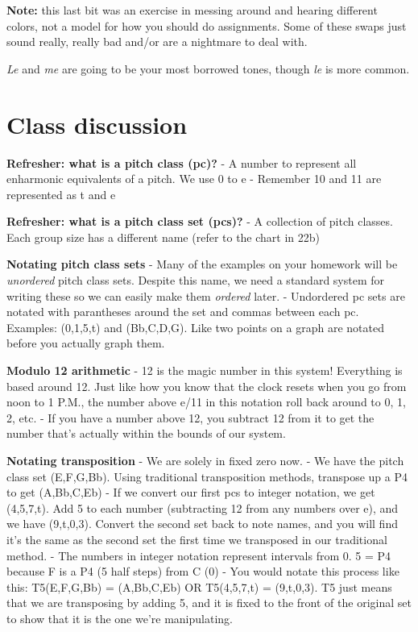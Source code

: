 \documentclass{book}
\begin{document}
\textbf{Note:} this last bit was an exercise in messing around and hearing
different colors, not a model for how you should do assignments. Some of these
swaps just sound really, really bad and/or are a nightmare to deal with.

\emph{Le} and \emph{me} are going to be your most borrowed tones, though
\emph{le} is more common.

\hypertarget{class-discussion-19}{%
\chapter{Class discussion}\label{class-discussion-19}}

\textbf{Refresher: what is a pitch class (pc)?} - A number to represent all
enharmonic equivalents of a pitch. We use 0 to e - Remember 10 and 11 are
represented as t and e

\textbf{Refresher: what is a pitch class set (pcs)?} - A collection of pitch
classes. Each group size has a different name (refer to the chart in 22b)

\textbf{Notating pitch class sets} - Many of the examples on your homework
will be \emph{unordered} pitch class sets. Despite this name, we need a
standard system for writing these so we can easily make them \emph{ordered}
later. - Undordered pc sets are notated with parantheses around the set and
commas between each pc. Examples: (0,1,5,t) and (Bb,C,D,G). Like two points on
a graph are notated before you actually graph them.

\textbf{Modulo 12 arithmetic} - 12 is the magic number in this system!
Everything is based around 12. Just like how you know that the clock resets
when you go from noon to 1 P.M., the number above e/11 in this notation roll
back around to 0, 1, 2, etc. - If you have a number above 12, you subtract 12
from it to get the number that's actually within the bounds of our system.

\textbf{Notating transposition} - We are solely in fixed zero now. - We have
the pitch class set (E,F,G,Bb). Using traditional transposition methods,
transpose up a P4 to get (A,Bb,C,Eb) - If we convert our first pcs to integer
notation, we get (4,5,7,t). Add 5 to each number (subtracting 12 from any
numbers over e), and we have (9,t,0,3). Convert the second set back to note
names, and you will find it's the same as the second set the first time we
transposed in our traditional method. - The numbers in integer notation
represent intervals from 0. 5 = P4 because F is a P4 (5 half steps) from C (0)
- You would notate this process like this: T5(E,F,G,Bb) = (A,Bb,C,Eb) OR
T5(4,5,7,t) = (9,t,0,3). T5 just means that we are transposing by adding 5,
and it is fixed to the front of the original set to show that it is the one
we're manipulating.
\end{document}
